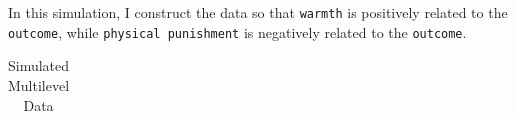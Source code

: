 \documentclass[
  letterpaper,
  DIV=11,
  numbers=noendperiod]{scrreprt}
\begin{document}
In this simulation, I construct the data so that \texttt{warmth} is
positively related to the \texttt{outcome}, while
\texttt{physical\ punishment} is negatively related to the
\texttt{outcome}.

\begin{longtable}[]{@{}
  >{\centering\arraybackslash}p{}
  >{\centering\arraybackslash}p{}
  >{\centering\arraybackslash}p{}
  >{\centering\arraybackslash}p{}
  >{\centering\arraybackslash}p{}
  >{\centering\arraybackslash}p{}
  >{\centering\arraybackslash}p{}@{}}

\caption{\label{tbl-simulateddata}Simulated Multilevel Data}

\tabularnewline


\end{longtable}
\end{document}
